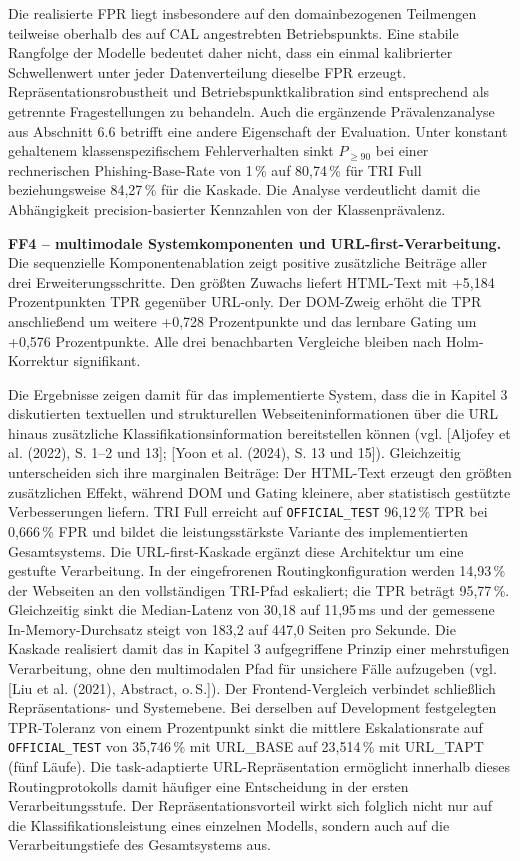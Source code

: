 Die realisierte FPR liegt insbesondere auf den domainbezogenen Teilmengen teilweise oberhalb
des auf CAL angestrebten Betriebspunkts. Eine stabile Rangfolge der Modelle bedeutet daher
nicht, dass ein einmal kalibrierter Schwellenwert unter jeder Datenverteilung dieselbe FPR
erzeugt. Repräsentationsrobustheit und Betriebspunktkalibration sind entsprechend als getrennte
Fragestellungen zu behandeln. Auch die ergänzende Prävalenzanalyse aus Abschnitt 6.6 betrifft eine andere Eigenschaft der
Evaluation. Unter konstant gehaltenem klassenspezifischem Fehlerverhalten sinkt
$P_{\geq 90}$ bei einer rechnerischen Phishing-Base-Rate von 1\,\% auf 80,74\,\%
für TRI Full beziehungsweise 84,27\,\% für die Kaskade. Die Analyse verdeutlicht damit
die Abhängigkeit precision-basierter Kennzahlen von der Klassenprävalenz.


\textbf{FF4 -- multimodale Systemkomponenten und URL-first-Verarbeitung.}
Die sequenzielle Komponentenablation zeigt positive zusätzliche Beiträge aller drei
Erweiterungsschritte. Den größten Zuwachs liefert HTML-Text mit +5,184 Prozentpunkten
TPR gegenüber URL-only. Der DOM-Zweig erhöht die TPR anschließend um weitere
+0,728 Prozentpunkte und das lernbare Gating um +0,576 Prozentpunkte. Alle drei
benachbarten Vergleiche bleiben nach Holm-Korrektur signifikant.

Die Ergebnisse zeigen damit für das implementierte System, dass die in Kapitel 3 diskutierten
textuellen und strukturellen Webseiteninformationen über die URL hinaus zusätzliche
Klassifikationsinformation bereitstellen können (vgl. [Aljofey et al. (2022), S. 1--2 und 13]; [Yoon et al. (2024), S. 13 und 15]). Gleichzeitig unterscheiden sich ihre marginalen Beiträge:
Der HTML-Text erzeugt den größten zusätzlichen Effekt, während DOM und Gating kleinere,
aber statistisch gestützte Verbesserungen liefern. TRI Full erreicht auf \nolinkurl{OFFICIAL_TEST} 96,12\,\% TPR bei 0,666\,\% FPR und
bildet die leistungsstärkste Variante des implementierten Gesamtsystems. Die
URL-first-Kaskade ergänzt diese Architektur um eine gestufte Verarbeitung. In der
eingefrorenen Routingkonfiguration werden 14,93\,\% der Webseiten an den vollständigen
TRI-Pfad eskaliert; die TPR beträgt 95,77\,\%. Gleichzeitig sinkt die Median-Latenz von
30,18 auf 11,95\,ms und der gemessene In-Memory-Durchsatz steigt von 183,2 auf
447,0 Seiten pro Sekunde. Die Kaskade realisiert damit das in Kapitel 3 aufgegriffene
Prinzip einer mehrstufigen Verarbeitung, ohne den multimodalen Pfad für unsichere Fälle
aufzugeben (vgl. [Liu et al. (2021), Abstract, o.\,S.]). Der Frontend-Vergleich verbindet schließlich Repräsentations- und Systemebene. Bei derselben
auf Development festgelegten TPR-Toleranz von einem Prozentpunkt sinkt die mittlere
Eskalationsrate auf \nolinkurl{OFFICIAL_TEST} von 35,746\,\% mit URL\_BASE
auf 23,514\,\% mit URL\_TAPT (fünf Läufe).
Die task-adaptierte URL-Repräsentation ermöglicht innerhalb dieses Routingprotokolls damit
häufiger eine Entscheidung in der ersten Verarbeitungsstufe. Der Repräsentationsvorteil wirkt
sich folglich nicht nur auf die Klassifikationsleistung eines einzelnen Modells, sondern auch
auf die Verarbeitungstiefe des Gesamtsystems aus.

